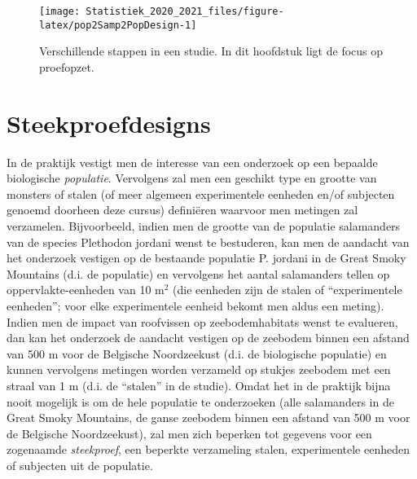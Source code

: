 \documentclass[
  12pt,dutch,coursenotes]{book}
\theoremstyle{definition}
\theoremstyle{definition}
\theoremstyle{definition}
\theoremstyle{remark}
\begin{document}
\begin{figure}

{\centering \texttt{[image: Statistiek\_2020\_2021\_files/figure-latex/pop2Samp2PopDesign-1]} 

}

\caption{Verschillende stappen in een studie. In dit hoofdstuk ligt de focus op proefopzet.}\label{fig:pop2Samp2PopDesign}
\end{figure}

\hypertarget{sec:steekproefdesigns}{%
\section{Steekproefdesigns}\label{sec:steekproefdesigns}}

In de praktijk vestigt men de interesse van een onderzoek op een bepaalde biologische \emph{populatie}. Vervolgens zal men een geschikt type en grootte van monsters of stalen (of meer algemeen experimentele eenheden en/of subjecten genoemd doorheen deze cursus) definiëren waarvoor men metingen zal verzamelen. Bijvoorbeeld, indien men de grootte van de populatie salamanders van de species Plethodon jordani wenst te bestuderen, kan men de aandacht van het onderzoek vestigen op de bestaande populatie P. jordani in de Great Smoky Mountains (d.i. de populatie) en vervolgens het aantal salamanders tellen op oppervlakte-eenheden van 10 m\(^2\) (die eenheden zijn de stalen of ``experimentele eenheden''; voor elke experimentele eenheid bekomt men aldus een meting). Indien men de impact van roofvissen op zeebodemhabitats wenst te evalueren, dan kan het onderzoek de aandacht vestigen op de zeebodem binnen een afstand van 500 m voor de Belgische Noordzeekust (d.i. de biologische populatie) en kunnen vervolgens metingen worden verzameld op stukjes zeebodem met een straal van 1 m (d.i. de ``stalen'' in de studie). Omdat het in de praktijk bijna nooit mogelijk is om de hele populatie te onderzoeken (alle salamanders in de Great Smoky Mountains, de ganse zeebodem binnen een afstand van 500 m voor de Belgische Noordzeekust), zal men zich beperken tot gegevens voor een zogenaamde \emph{steekproef}, een beperkte verzameling stalen, experimentele eenheden of subjecten uit de populatie.
\end{document}
